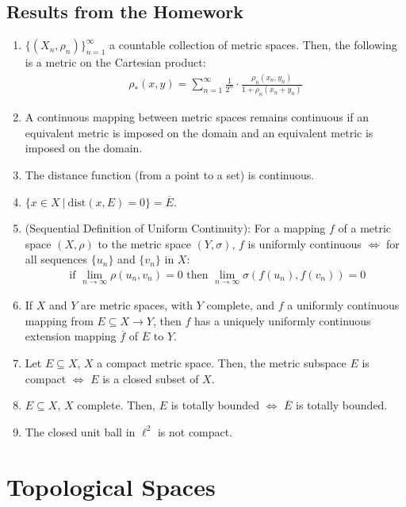 \documentclass[11pt]{article}
\theoremstyle{definition}
\theoremstyle{definition}
\theoremstyle{definition}
\theoremstyle{remark}
\begin{document}
\subsection{Results from the Homework}

\begin{enumerate}[noitemsep]
	\item $\{ (X_n, \rho_n) \}_{n=1}^\infty$ a countable collection of metric spaces. Then, the following is a metric on the Cartesian product: 
	\begin{align*}
		\rho_*(x,y) = \sum_{n=1}^\infty \frac{1}{2^n} \cdot \frac{\rho_n(x_n, y_n)}{1 + \rho_n(x_n + y_n)}
	\end{align*}
	\item A continuous mapping between metric spaces remains continuous if an equivalent metric is imposed on the domain and an equivalent metric is imposed on the domain. 
	\item The distance function (from a point to a set) is continuous. 
	\item $\{ x \in X\ |\ \text{dist}(x,E) = 0 \} = \overline{E}$. 
	\item (Sequential Definition of Uniform Continuity): For a mapping $f$ of a metric space $(X, \rho)$ to the metric space $(Y, \sigma)$, $f$ is uniformly continuous $\iff$ for all sequences $\{ u_n \}$ and $\{ v_n \}$ in $X$: 
	\begin{align*}
		\text{ if } \lim_{n \rightarrow \infty} \rho(u_n, v_n) = 0 \text{ then } \lim_{n \rightarrow \infty} \sigma (f(u_n), f(v_n)) = 0 
	\end{align*}
	\item If $X$ and $Y$ are metric spaces, with $Y$ complete, and $f$ a uniformly continuous mapping from $E \subseteq X \rightarrow Y$, then $f$ has a uniquely uniformly continuous extension mapping $\overline{f}$ of $\overline{E}$ to $Y$. 
	\item Let $E \subseteq X$, $X$ a compact metric space. Then, the metric subspace $E$ is compact $\iff$ $E$ is a closed subset of $X$. 
	\item $E \subseteq X$, $X$ complete. Then, $E$ is totally bounded $\iff$ $\overline{E}$ is totally bounded. 
	\item The closed unit ball in $\ell^2$ is not compact. 
\end{enumerate}


\section{Topological Spaces}
\end{document}
